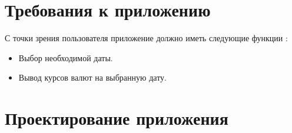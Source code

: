 \documentclass[a4paper,12pt]{article}
\begin{document}


\newpage
\section{Требования к приложению}

С точки зрения пользователя приложение должно иметь следующие функции :
\begin{itemize}
    \item Выбор необходимой даты.
    \item Вывод курсов валют на выбранную дату.
\end{itemize}
 

\newpage
\section{Проектирование приложения}
\end{document}
